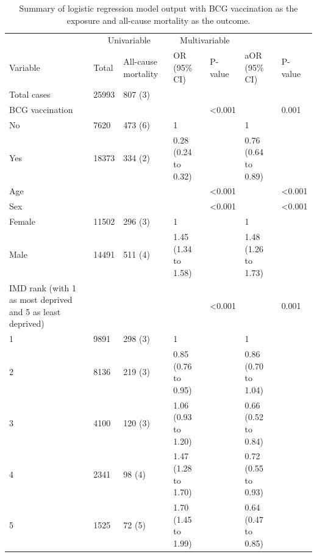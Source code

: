 \documentclass[11pt,twoside]{bristolthesis}
\begin{document}
  \begin{table}[!h]
  
  \caption{\label{tab:06-bcg-mortality}Summary of logistic regression model output with BCG vaccination as the exposure and all-cause mortality as the outcome.}
  \centering
  \fontsize{8}{10}\selectfont
  \begin{tabular}{>{\raggedright\arraybackslash}p{2cm}llllll}
  \toprule
  \multicolumn{3}{c}{ } & \multicolumn{2}{c}{Univariable} & \multicolumn{2}{c}{Multivariable} \\
  \cmidrule(l{3pt}r{3pt}){4-5} \cmidrule(l{3pt}r{3pt}){6-7}
  Variable & Total & All-cause mortality & OR (95\% CI) & P-value & aOR (95\% CI) & P-value\\
  \midrule
  Total cases & 25993 & 807 (3) &  &  &  & \\
  BCG vaccination &  &  &  & <0.001 &  & 0.001\\
  \hspace{1em}No & 7620 & 473 (6) & 1 &  & 1 & \\
  \hspace{1em}Yes & 18373 & 334 (2) & 0.28 (0.24 to 0.32) &  & 0.76 (0.64 to 0.89) & \\
  Age &  &  &  & <0.001 &  & <0.001\\
  \addlinespace
  Sex &  &  &  & <0.001 &  & <0.001\\
  \hspace{1em}Female & 11502 & 296 (3) & 1 &  & 1 & \\
  \hspace{1em}Male & 14491 & 511 (4) & 1.45 (1.34 to 1.58) &  & 1.48 (1.26 to 1.73) & \\
  IMD rank (with 1 as most deprived and 5 as least deprived) &  &  &  & <0.001 &  & 0.001\\
  \hspace{1em}1 & 9891 & 298 (3) & 1 &  & 1 & \\
  \addlinespace
  \hspace{1em}2 & 8136 & 219 (3) & 0.85 (0.76 to 0.95) &  & 0.86 (0.70 to 1.04) & \\
  \hspace{1em}3 & 4100 & 120 (3) & 1.06 (0.93 to 1.20) &  & 0.66 (0.52 to 0.84) & \\
  \hspace{1em}4 & 2341 & 98 (4) & 1.47 (1.28 to 1.70) &  & 0.72 (0.55 to 0.93) & \\
  \hspace{1em}5 & 1525 & 72 (5) & 1.70 (1.45 to 1.99) &  & 0.64 (0.47 to 0.85) & \\

\end{tabular}
\end{table}
\end{document}
